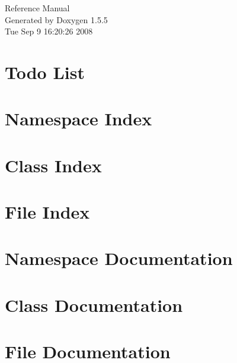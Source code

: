 \documentclass[a4paper]{book}
\begin{document}
\begin{titlepage}
\vspace*{7cm}
\begin{center}
{\Large Reference Manual}\\
\vspace*{1cm}
{\large Generated by Doxygen 1.5.5}\\
\vspace*{0.5cm}
{\small Tue Sep 9 16:20:26 2008}\\
\end{center}
\end{titlepage}
\clearemptydoublepage
{}
\tableofcontents
\clearemptydoublepage
{}
\chapter{Todo List}

\chapter{Namespace Index}

\chapter{Class Index}

\chapter{File Index}

\chapter{Namespace Documentation}









\chapter{Class Documentation}


\chapter{File Documentation}


\printindex
\end{document}
